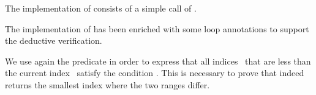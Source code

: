 The implementation of  consists of a simple call of \mismatch.



The implementation of 
has been enriched with some loop annotations to support the deductive verification.



We use again the predicate 
in order to express that all indices~ that are less than the
current index~
satisfy the condition .
This is necessary to prove that \mismatch indeed returns the smallest index
where the two ranges differ.

\clearpage

